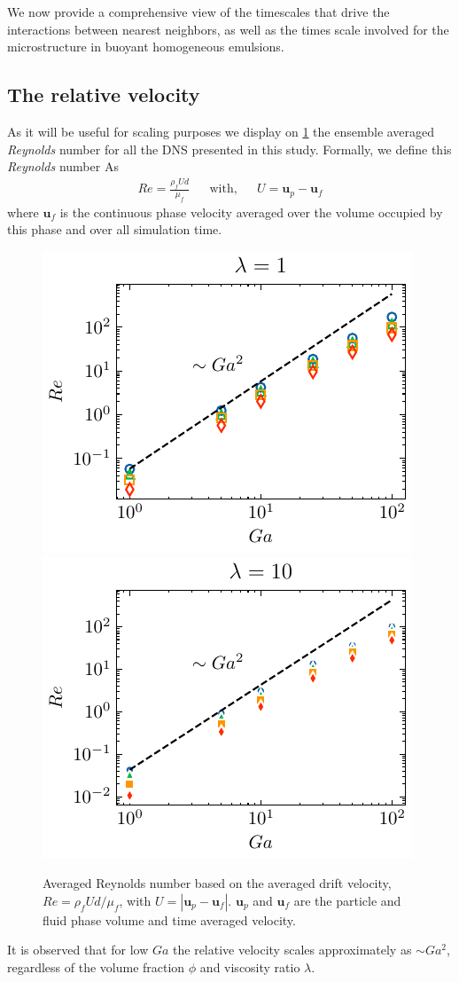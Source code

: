 We now provide a comprehensive view of the timescales that drive the interactions between nearest neighbors, as well as the times scale involved for the microstructure in buoyant homogeneous emulsions.

\subsection{The relative velocity}

As it will be useful for scaling purposes we display on \ref{fig:Reall} the ensemble averaged \textit{Reynolds} number for all the DNS presented in this study.
Formally, we define this \textit{Reynolds} number As
\begin{align*}
    Re = \frac{\rho_f U d}{\mu_f} && \text{with}, && U = \textbf{u}_p - \textbf{u}_f
\end{align*}
where $\textbf{u}_f$ is the continuous phase velocity averaged over the volume occupied by this phase and over all simulation time. 
\begin{figure}[h!]
    \centering
    \includegraphics[height = 0.3\textwidth]{image/HOMOGENEOUS_NEW/CA/Re_l_1.pdf}
    \includegraphics[height = 0.3\textwidth]{image/HOMOGENEOUS_NEW/CA/Re_l_10.pdf}
    \caption{
        Averaged Reynolds number based on the averaged drift velocity, $Re = \rho_fU d /\mu_f$, with $U = |\textbf{u}_p - \textbf{u}_f|$.
        $\textbf{u}_p$ and $\textbf{u}_f$ are the particle and fluid phase volume and time averaged velocity.
    }
    \label{fig:Reall}
\end{figure}
It is observed that for low $Ga$ the relative velocity scales approximately as $\sim Ga^2$, regardless of the volume fraction $\phi$ and viscosity ratio $\lambda$. 

